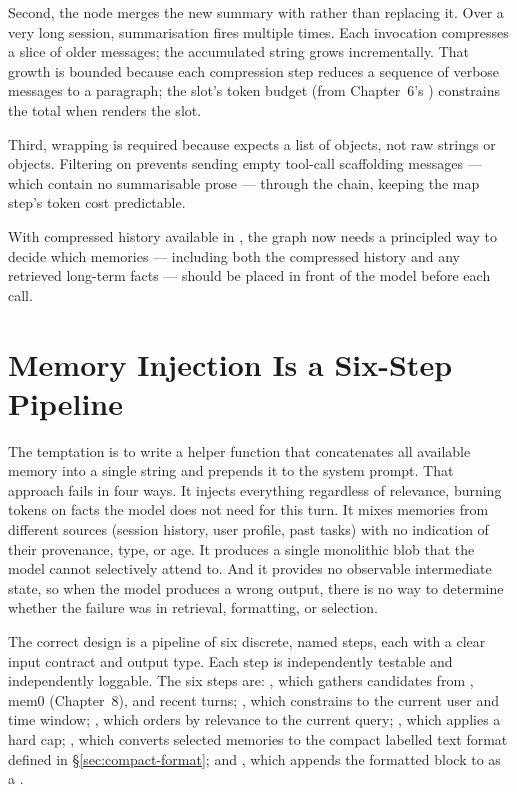 Second, the node merges the new summary with 
rather than replacing it. Over a very long session, summarisation fires
multiple times. Each invocation compresses a slice of older messages;
the accumulated  string grows incrementally. That growth
is bounded because each compression step reduces a sequence of verbose
messages to a paragraph; the  slot's token budget (from
Chapter~6's ) constrains the total when
 renders the slot.

Third,  wrapping is required because
 expects a list of
 objects, not raw strings or
 objects. Filtering on  prevents
sending empty tool-call scaffolding messages --- which contain no
summarisable prose --- through the chain, keeping the map step's
token cost predictable.

With compressed history available in , the
graph now needs a principled way to decide which memories --- including
both the compressed history and any retrieved long-term facts --- should
be placed in front of the model before each call.

\section{Memory Injection Is a Six-Step Pipeline}
\label{sec:injection-pipeline}

The temptation is to write a helper function that concatenates all
available memory into a single string and prepends it to the system
prompt. That approach fails in four ways. It injects everything regardless
of relevance, burning tokens on facts the model does not need for this
turn. It mixes memories from different sources (session history, user
profile, past tasks) with no indication of their provenance, type, or
age. It produces a single monolithic blob that the model cannot
selectively attend to. And it provides no observable intermediate
state, so when the model produces a wrong output, there is no way to
determine whether the failure was in retrieval, formatting, or selection.

The correct design is a pipeline of six discrete, named steps, each
with a clear input contract and output type. Each step is independently
testable and independently loggable. The six steps are:
, which gathers candidates from
, mem0 (Chapter~8), and recent turns;
, which constrains to the current user and
time window; , which orders by relevance to the
current query; , which applies a hard cap;
, which converts selected memories to the
compact labelled text format defined in \S\ref{sec:compact-format}; and
, which appends the formatted block to
 as a .

